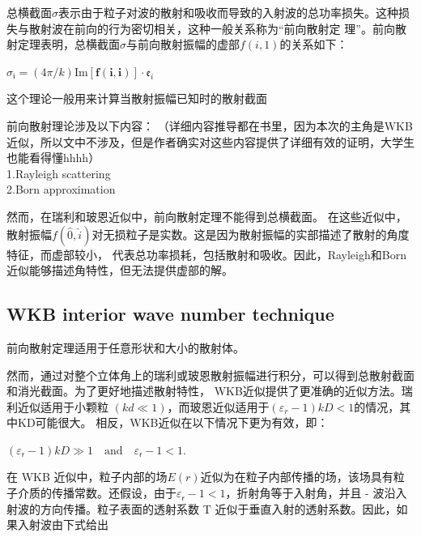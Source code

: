 \documentclass[12pt, a4paper, oneside]{ctexart}
\begin{document}
\begin{spacing}{2.0}
总横截面$\sigma$表示由于粒子对波的散射和吸收而导致的入射波的总功率损失。这种损失与散射波在前向的行为密切相关，这种一般关系称为“前向散射定
理”。前向散射定理表明，总横截面$\sigma$与前向散射振幅的虚部$f(i,1)$的关系如下：

\begin{center}
    $\sigma_\mathfrak{i}=(4\pi/k)\text{Im}[\mathbf{f}(\mathbf{i},\mathbf{i})]\cdot\mathfrak{e}_i$
\end{center}
这个理论一般用来计算当散射振幅已知时的散射截面


前向散射理论涉及以下内容：\cite{5472149}
（详细内容推导都在书里，因为本次的主角是WKB近似，所以文中不涉及，但是作者确实对这些内容提供了详细有效的证明，大学生也能看得懂hhhh）\\
1.Rayleigh scattering\\
2.Born approximation

然而，在瑞利和玻恩近似中，前向散射定理不能得到总横截面。
在这些近似中，散射振幅$f(\hat{0} , \hat{i})$对无损粒子是实数。这是因为散射振幅的实部描述了散射的角度特征，而虚部较小，
代表总功率损耗，包括散射和吸收。因此，Rayleigh和Born近似能够描述角特性，但无法提供虚部的解。


\subsection{WKB interior wave number technique}
前向散射定理适用于任意形状和大小的散射体。

然而，通过对整个立体角上的瑞利或玻恩散射振幅进行积分，可以得到总散射截面和消光截面。为了更好地描述散射特性，
WKB近似提供了更准确的近似方法。瑞利近似适用于小颗粒 $(kd\ll 1)$，而玻恩近似适用于$(\varepsilon_r-1)kD < 1$的情况，其中KD可能很大。
相反，WKB近似在以下情况下更为有效，即：
\begin{center}
    $\displaystyle (\varepsilon_\mathsf{r}-1)kD\gg1\quad\text{and}\quad\varepsilon_\mathsf{r}-1<1.$
\end{center}
在 WKB 近似中，粒子内部的场$E(r)$近似为在粒子内部传播的场，该场具有粒子介质的传播常数。还假设，由于$\varepsilon_\mathsf{r}-1<1$，折射角等于入射角，并且 - 波沿入
射波的方向传播。粒子表面的透射系数 T 近似于垂直入射的透射系数。因此，如果入射波由下式给出


\end{spacing}
\end{document}
